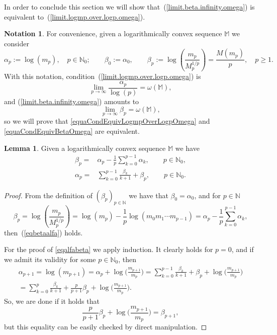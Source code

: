 \documentclass[11pt,a4paper]{article}
\theoremstyle{definition}
\newtheorem{lemma}[theo]{Lemma}
\newtheorem{nota}[theo]{Notation}
\def\oo{\infty}
\def\ri{\rightarrow}
\def\a{\alpha}
\def\b{\beta}
\def\o{\omega}
\def\N{\mathbb{N}}
\def\M{\mathbb{M}}
\begin{document}
In order to conclude this section we will show that~(\ref{limit.beta.infinity.omega}) is equivalent to~(\ref{limit.logmp.over.logp.omega}).

\begin{nota}\label{notacionAlfaBeta}
For convenience, %
given a logarithmically convex
sequence $\M$ we consider
$$\a_p:=\log(m_p),\quad p\in\N_0; \qquad \b_0:=\a_0, \qquad \b_p:=\log\left(\frac{m_p}{M^{1/p}_p}\right)=\frac{M(m_p)}{p}, \quad p\geq1.$$
With this notation, condition~(\ref{limit.logmp.over.logp.omega}) is
\begin{equation}\label{equaCondEquivLogmpOverLogpOmega}
\lim_{p\ri\oo} \frac{\a_p}{\log(p)}=\o(\M),
\end{equation}
and (\ref{limit.beta.infinity.omega}) amounts to
\begin{equation}\label{equaCondEquivBetaOmega}
\lim_{p\ri\oo} \b_p=\o(\M),
\end{equation}
so we will prove that \eqref{equaCondEquivLogmpOverLogpOmega} and \eqref{equaCondEquivBetaOmega} are equivalent.
\end{nota}


\begin{lemma}
 Given a logarithmically convex
 sequence $\M$ we have
 \begin{align}
  \b_p=&\a_p-\frac{1}{p}\sum^{p-1}_{k=0}\a_k,\qquad p\in\N_0, \label{eqbetaalfa}\\
  \a_p=&\sum^{p-1}_{k=0}\frac{\b_k}{k+1}+\b_p, \qquad p\in\N_0.\label{eqalfabeta}
 \end{align}
 \end{lemma}
 \begin{proof}
  From the definition of $(\b_p)_{p\in\N}$ we have that $\b_0=\a_0$, and for $p\in\N$
  $$\b_p= \log\left(\frac{m_p}{M^{1/p}_p}\right)=\log(m_p)-\frac{1}{p}\log(m_0m_1\cdots m_{p-1})=\a_p-\frac{1}{p}\sum^{p-1}_{k=0}\a_k,$$
    then~(\ref{eqbetaalfa}) holds.

    For the proof of \eqref{eqalfabeta} we apply induction. It clearly holds for $p=0$, and if we admit its validity for some $p\in\N_0$, then
    \begin{multline*}
    \a_{p+1}=\log(m_{p+1})=\a_p+\log\big(\frac{m_{p+1}}{m_p}\big)= \sum^{p-1}_{k=0}\frac{\b_k}{k+1}+\b_p+\log\big(\frac{m_{p+1}}{m_p}\big)\\
    =\sum^{p}_{k=0}\frac{\b_k}{k+1}+\frac{p}{p+1}\b_p+\log\big(\frac{m_{p+1}}{m_p}\big).
    \end{multline*}
So, we are done if it holds that
$$
\frac{p}{p+1}\b_p+\log\big(\frac{m_{p+1}}{m_p}\big)=\b_{p+1},$$
but this equality can be easily checked by direct manipulation.
 \end{proof}
\end{document}

